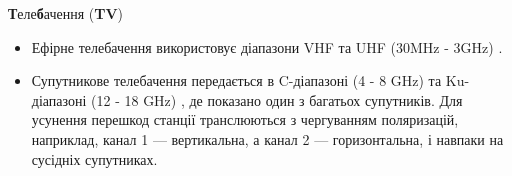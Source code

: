 {\Large {\bfseries Т}еле{\bfseries б}ачення ({\bfseries TV})}
{
\begin{itemize}

\item Ефірне телебачення використовує діапазони VHF та UHF (30MHz - 3GHz)  \hspace{.1in}.

\item Супутникове телебачення передається в C-діапазоні (4 - 8 GHz)
\hspace{.1in} та Ku-діапазоні (12 - 18 GHz)  \hspace{.08in}, де показано один з багатьох супутників. Для усунення перешкод станції транслюються з чергуванням поляризацій, наприклад, канал 1 --- вертикальна, а канал 2 --- горизонтальна, і навпаки на сусідніх супутниках.


\end{itemize}}
